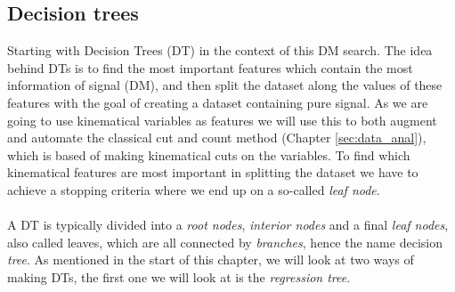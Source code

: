 \documentclass[12pt, a4paper]{book}
\begin{document}
\subsection{Decision trees}
Starting with Decision Trees (DT) in the context of this DM search. The idea behind DTs is to find the most important features which contain the most information of signal (DM), and then split the dataset along the values of these features with the goal of creating a dataset containing pure signal. 
As we are going to use kinematical variables as features we will use this to both augment and automate the classical cut and count method (Chapter \ref{sec:data_anal}), which is based of making kinematical cuts on the variables. To find which kinematical features are most important 
in splitting the dataset we have to achieve a stopping criteria where we end up on a so-called \textit{leaf node}.\\
\\A DT is typically divided into a \textit{root nodes}, \textit{interior nodes} and a final \textit{leaf nodes}, also called leaves, which are all connected by \textit{branches}, hence the name decision \textit{tree}. As mentioned in the start of this chapter, we will look at two ways of making DTs, 
the first one we will look at is the \textit{regression tree}. 
\end{document}
